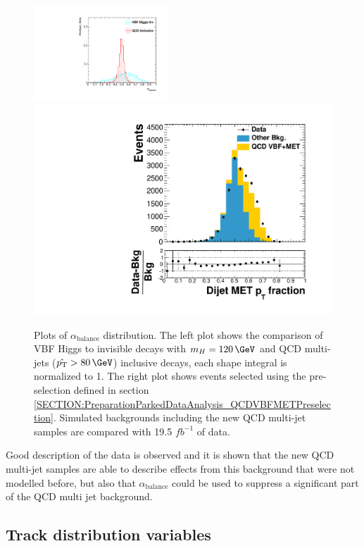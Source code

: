 \begin{figure}[!htb]
\centering
\includegraphics[width=0.45\textwidth]{Chapter06/TopologicalVariables/Images/JetPair_dijetOverMetPt.pdf} 
\includegraphics[width=0.45\linewidth]{Chapter06/QCD_VBFMET_Samples/PreSelection/Images//DEta3p6_MetSig3p0_MinDPhiJetsMet1p5/dijetmet_ptfraction.pdf}
\caption[Plots comparing the distribution of $\alpha_{\text{balance}}$ for VBF Higgs to invisible decays with $m_H=120\,\GeV$ and QCD multi-jets samples.]
{Plots of $\alpha_{\text{balance}}$ distribution. The left plot shows the comparison of \gls{VBF} Higgs to invisible decays with $m_H=120\,\GeV$ and \gls{QCD} multi-jets ($\hat{\pt}>80\,\GeV$) inclusive decays, each shape integral is normalized to 1. The right plot shows events selected using the pre-selection defined in section \ref{SECTION:PreparationParkedDataAnalysis_QCDVBFMETPreselection}. Simulated backgrounds including the new \gls{QCD} multi-jet samples are compared with 19.5 $fb^{-1}$ of data.}
\label{FIGURE:PreparationParkedDataAnalysis_DijetMETSystemVars_2}
\end{figure}

Good description of the data is observed and it is shown that the new \gls{QCD} multi-jet samples are able to describe effects from this background that were not modelled before, but also that $\alpha_{\text{balance}}$ could be used to suppress a significant part of the \gls{QCD} multi jet background.

\subsection{Track distribution variables}
\label{SECTION:PreparationParkedDataAnalysis_TrackDistributionVariables}

